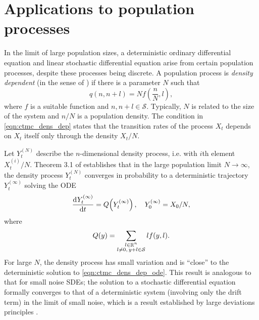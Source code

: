 


\section{Applications to population processes}
In the limit of large population sizes, a deterministic ordinary differential equation and linear stochastic differential equation arise from certain population processes, despite these processes being discrete.
A population process is \emph{density dependent} (in the sense of \citet{Kurtz_1970_SolutionsOrdinaryDifferential}) if there is a parameter \(N\) such that
\begin{equation}
	q\!\left(n, n+l\right) = Nf\!\left(\frac{n}{N}, l\right),
	\label{eqn:ctmc_dens_dep}
\end{equation}
where \(f\) is a suitable function and \(n, n+l \in \mathcal{S}\).
Typically, \(N\) is related to the size of the system and \(n / N\) is a population density.
The condition in \cref{eqn:ctmc_dens_dep} states that the transition rates of the process \(X_t\) depends on \(X_t\) itself only through the density \(X_t / N\).

Let \(Y_t^{(N)}\) describe the \(n\)-dimensional density process, i.e. with \(i\)th element \(X_t^{(i)} / N\).
Theorem 3.1 of \citet{Kurtz_1970_SolutionsOrdinaryDifferential} establishes that in the large population limit \(N \to \infty\), the density process \(Y_t^{(N)}\) converges in probability to a deterministic trajectory \(Y_t^{(\infty)}\) solving the ODE
\begin{equation}
	\dod{Y_t^{(\infty)}}{t} = Q\!\left(Y_t^{(\infty)}\right), \quad Y_0^{(\infty)} = X_0 / N,
	\label{eqn:ctmc_dens_dep_ode}
\end{equation}
where
\[
	Q\!\left(y\right) = \sum_{\substack{l \in \mathbb{R}^n \\ l \neq 0,\, y + l \in \mathcal{S}}}{l f\!\left(y, l\right)}.
\]
For large \(N\), the density process has small variation and is ``close'' to the deterministic solution to \cref{eqn:ctmc_dens_dep_ode}.
This result is analogous to that for small noise SDEs; the solution to a stochastic differential equation formally converges to that of a deterministic system (involving only the drift term) in the limit of small noise, which is a result established by large deviations principles \citep[e.g]{FreidlinWentzell_1998_RandomPerturbationsDynamical}.

